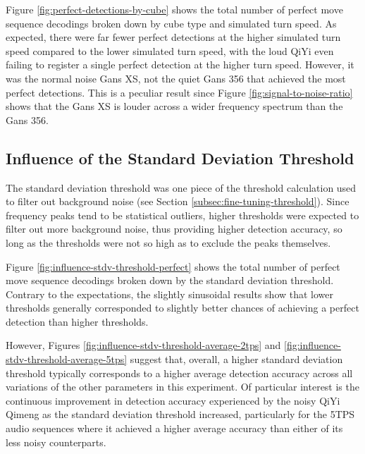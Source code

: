Figure \ref{fig:perfect-detections-by-cube} shows the total number of
perfect move sequence decodings broken down by cube type and simulated
turn speed. As expected, there were far fewer perfect detections at the
higher simulated turn speed compared to the lower simulated turn speed,
with the loud QiYi even failing to register a single perfect detection
at the higher turn speed. However, it was the normal noise Gans XS, not
the quiet Gans 356 that achieved the most perfect detections. This is a
peculiar result since Figure \ref{fig:signal-to-noise-ratio} shows that
the Gans XS is louder across a wider frequency spectrum than the Gans
356.

\subsection{Influence of the Standard Deviation Threshold}
\label{subsec:influence-stdv-threshold}

The standard deviation threshold was one piece of the threshold
calculation used to filter out background noise (see Section
\ref{subsec:fine-tuning-threshold}). Since frequency peaks tend to be
statistical outliers, higher thresholds were expected to filter out
more background noise, thus providing higher detection accuracy, so
long as the thresholds were not so high as to exclude the peaks
themselves.

Figure \ref{fig:influence-stdv-threshold-perfect} shows the total number of
perfect move sequence decodings broken down by the standard deviation
threshold. Contrary to the expectations, the slightly sinusoidal results show that lower thresholds generally corresponded to slightly better chances of achieving a perfect detection than higher thresholds.

However, Figures \ref{fig:influence-stdv-threshold-average-2tps} and
\ref{fig:influence-stdv-threshold-average-5tps} suggest that, overall,
a higher standard deviation threshold typically corresponds to a higher
average detection accuracy across all variations of the other parameters in
this experiment. Of particular interest is the continuous improvement
in detection accuracy experienced by the noisy QiYi Qimeng as the
standard deviation threshold increased, particularly for the 5TPS audio
sequences where it achieved a higher average accuracy than either of
its less noisy counterparts.

